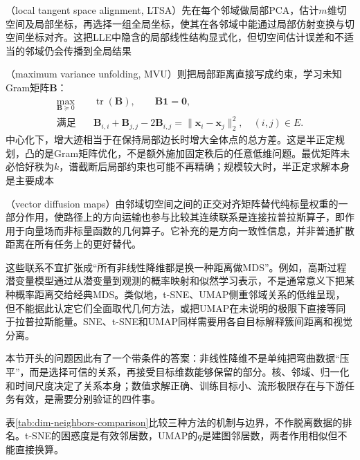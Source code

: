 （local tangent space alignment, LTSA）先在每个邻域做局部PCA，估计$m$维切空间及局部坐标，再选择一组全局坐标，使其在各邻域中能通过局部仿射变换与切空间坐标对齐。这把LLE中隐含的局部线性结构显式化，但切空间估计误差和不适当的邻域仍会传播到全局结果

（maximum variance unfolding, MVU）则把局部距离直接写成约束，学习未知Gram矩阵$\bm{B}$：
\[
  \begin{aligned}
    \max_{\bm{B}\succeq0}\quad&
      \operatorname{tr}(\bm{B}),\qquad \bm{B}\bm{1}=\bm{0},\\
    \text{满足}\quad&
      \bm{B}_{i,i}+\bm{B}_{j,j}-2\bm{B}_{i,j}
      =\lVert\bm{x}_i-\bm{x}_j\rVert_2^2,\quad(i,j)\in E.
  \end{aligned}
\]
中心化下，增大迹相当于在保持局部边长时增大全体点的总方差。这是半正定规划，凸的是Gram矩阵优化，不是额外施加固定秩后的任意低维问题。最优矩阵未必恰好秩为$k$，谱截断后局部约束也可能不再精确；规模较大时，半正定求解本身是主要成本

（vector diffusion maps）由邻域切空间之间的正交对齐矩阵替代纯标量权重的一部分作用，使路径上的方向运输也参与比较其连续联系是连接拉普拉斯算子，即作用于向量场而非标量函数的几何算子。它补充的是方向一致性信息，并非普通扩散距离在所有任务上的更好替代。

这些联系不宜扩张成“所有非线性降维都是换一种距离做MDS”。例如，高斯过程潜变量模型通过从潜变量到观测的概率映射和似然学习表示，不是通常意义下把某种概率距离交给经典MDS。类似地，t-SNE、UMAP侧重邻域关系的低维呈现，但不能据此认定它们全面取代几何方法，或把UMAP在未说明的极限下直接等同于拉普拉斯能量。SNE、t-SNE和UMAP同样需要用各自目标解释簇间距离和视觉分离。

本节开头的问题因此有了一个带条件的答案：非线性降维不是单纯把弯曲数据“压平”，而是选择可信的关系，再接受目标维数能够保留的部分。核、邻域、归一化和时间尺度决定了关系本身；数值求解正确、训练目标小、流形极限存在与下游任务有效，是需要分别验证的四件事。

表\ref{tab:dim-neighbors-comparison}比较三种方法的机制与边界，不作脱离数据的排名。t-SNE的困惑度是有效邻居数，UMAP的$q$是建图邻居数，两者作用相似但不能直接换算。

